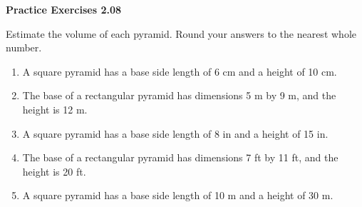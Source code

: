 \vspace{0.3ex}
\noindent\textbf{Practice Exercises 2.08}

\vspace{0.2ex}

Estimate the volume of each pyramid. Round your answers to the nearest whole number.

\begin{enumerate}[noitemsep, label = \color{blue}\arabic*. ]
    \item A square pyramid has a base side length of 6 cm and a height of 10 cm.
    \item The base of a rectangular pyramid has dimensions 5 m by 9 m, and the height is 12 m.
    \item A square pyramid has a base side length of 8 in and a height of 15 in.
    \item The base of a rectangular pyramid has dimensions 7 ft by 11 ft, and the height is 20 ft.
    \item A square pyramid has a base side length of 10 m and a height of 30 m.
\end{enumerate}
